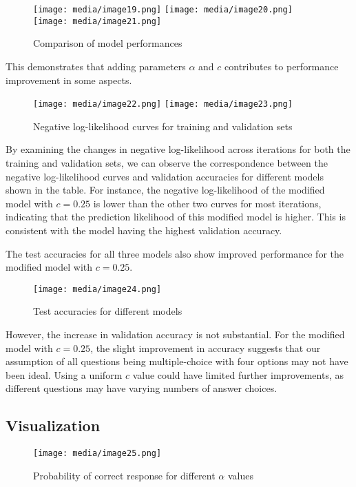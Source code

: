 \documentclass{article}
\begin{document}
\begin{figure}[htbp]
\centering
\texttt{[image: media/image19.png]}
\texttt{[image: media/image20.png]}
\texttt{[image: media/image21.png]}
\caption{Comparison of model performances}
\end{figure}

This demonstrates that adding parameters $\alpha$ and $c$ contributes to performance improvement in some aspects.

\begin{figure}[htbp]
\centering
\texttt{[image: media/image22.png]}
\texttt{[image: media/image23.png]}
\caption{Negative log-likelihood curves for training and validation sets}
\end{figure}

By examining the changes in negative log-likelihood across iterations for both the training and validation sets, we can observe the correspondence between the negative log-likelihood curves and validation accuracies for different models shown in the table. For instance, the negative log-likelihood of the modified model with $c = 0.25$ is lower than the other two curves for most iterations, indicating that the prediction likelihood of this modified model is higher. This is consistent with the model having the highest validation accuracy.

The test accuracies for all three models also show improved performance for the modified model with $c = 0.25$.

\begin{figure}[htbp]
\centering
\texttt{[image: media/image24.png]}
\caption{Test accuracies for different models}
\end{figure}

However, the increase in validation accuracy is not substantial. For the modified model with $c = 0.25$, the slight improvement in accuracy suggests that our assumption of all questions being multiple-choice with four options may not have been ideal. Using a uniform $c$ value could have limited further improvements, as different questions may have varying numbers of answer choices.

\subsection{Visualization}

\begin{figure}[htbp]
\centering
\texttt{[image: media/image25.png]}
\caption{Probability of correct response for different $\alpha$ values}
\end{figure}
\end{document}
